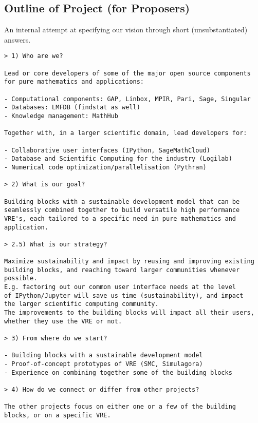 \begin{draft}
\red

\section*{Outline of Project (for Proposers)}



An internal attempt at specifying our vision through short
(unsubstantiated) answers.

\begin{verbatim}
> 1) Who are we?

Lead or core developers of some of the major open source components
for pure mathematics and applications:

- Computational components: GAP, Linbox, MPIR, Pari, Sage, Singular
- Databases: LMFDB (findstat as well)
- Knowledge management: MathHub

Together with, in a larger scientific domain, lead developers for:

- Collaborative user interfaces (IPython, SageMathCloud)
- Database and Scientific Computing for the industry (Logilab)
- Numerical code optimization/parallelisation (Pythran)

> 2) What is our goal?

Building blocks with a sustainable development model that can be
seamlessly combined together to build versatile high performance
VRE's, each tailored to a specific need in pure mathematics and
application.

> 2.5) What is our strategy?

Maximize sustainability and impact by reusing and improving existing
building blocks, and reaching toward larger communities whenever possible.
E.g. factoring out our common user interface needs at the level
of IPython/Jupyter will save us time (sustainability), and impact
the larger scientific computing community.
The improvements to the building blocks will impact all their users,
whether they use the VRE or not.

> 3) From where do we start?

- Building blocks with a sustainable development model
- Proof-of-concept prototypes of VRE (SMC, Simulagora)
- Experience on combining together some of the building blocks

> 4) How do we connect or differ from other projects?

The other projects focus on either one or a few of the building
blocks, or on a specific VRE.


\end{verbatim}
\end{draft}
